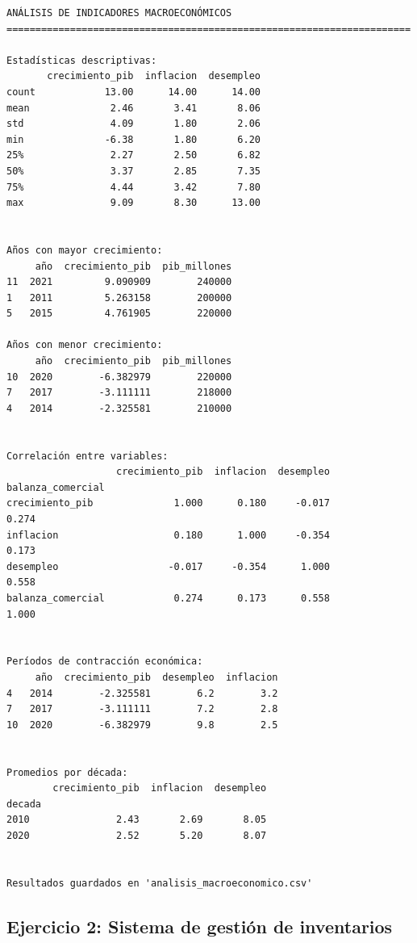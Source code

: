 \documentclass[
  doc,
  floatsintext,
  longtable,
  a4paper,
  nolmodern,
  notxfonts,
  notimes,
  12pt,
  colorlinks=true,linkcolor=blue,citecolor=blue,urlcolor=blue]{apa7}
\begin{document}
\begin{verbatim}
ANÁLISIS DE INDICADORES MACROECONÓMICOS
======================================================================

Estadísticas descriptivas:
       crecimiento_pib  inflacion  desempleo
count            13.00      14.00      14.00
mean              2.46       3.41       8.06
std               4.09       1.80       2.06
min              -6.38       1.80       6.20
25%               2.27       2.50       6.82
50%               3.37       2.85       7.35
75%               4.44       3.42       7.80
max               9.09       8.30      13.00


Años con mayor crecimiento:
     año  crecimiento_pib  pib_millones
11  2021         9.090909        240000
1   2011         5.263158        200000
5   2015         4.761905        220000

Años con menor crecimiento:
     año  crecimiento_pib  pib_millones
10  2020        -6.382979        220000
7   2017        -3.111111        218000
4   2014        -2.325581        210000


Correlación entre variables:
                   crecimiento_pib  inflacion  desempleo  balanza_comercial
crecimiento_pib              1.000      0.180     -0.017              0.274
inflacion                    0.180      1.000     -0.354              0.173
desempleo                   -0.017     -0.354      1.000              0.558
balanza_comercial            0.274      0.173      0.558              1.000


Períodos de contracción económica:
     año  crecimiento_pib  desempleo  inflacion
4   2014        -2.325581        6.2        3.2
7   2017        -3.111111        7.2        2.8
10  2020        -6.382979        9.8        2.5


Promedios por década:
        crecimiento_pib  inflacion  desempleo
decada                                       
2010               2.43       2.69       8.05
2020               2.52       5.20       8.07


Resultados guardados en 'analisis_macroeconomico.csv'
\end{verbatim}

\subsection{Ejercicio 2: Sistema de gestión de
inventarios}\label{ejercicio-2-sistema-de-gestiuxf3n-de-inventarios}
\end{document}
